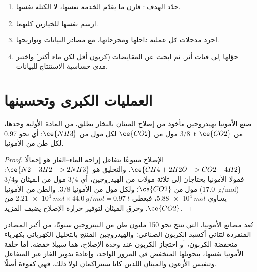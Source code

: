 \begin{method}\label{met:b3:green-industrial:lca}
\begin{enumerate}
  \item حدّد الهدف : قارن ما يقدّم الخدمة
        نفسها، لا الكتلة نفسها.
  \item ارسم  نفسها للخيارين كليهما.
  \item اجرد مدخلات كل عملية داخلها ومخرجاتها، مع مصادر
        البيانات وتواريخها.
  \item حوّلها إلى فئات أثر، ثم ابحث عن المقايضات (كربون أقل لكن
        ماء أكثر) واختبر مدى حساسية الاستنتاج للبيانات.
\end{enumerate}
\end{method}

\section{العمليات الكبرى وتحسينها}

\begin{proposition}\label{prop:b3:green-industrial:smr}
صنع الأمونيا بهيدروجين مأخوذ من إصلاح الميثان بالبخار يطلق، من
المادة الأولية وحدها، $3/8$ مول من $\ce{CO2}$ لكل مول من $\ce{NH3}$: أي نحو \qty{0.97}{t} من $\ce{CO2}$ لكل طن من الأمونيا.
\end{proposition}

\begin{proof}
الإصلاح متبوعًا بتفاعل إزاحة الماء--الغاز هو إجمالًا $\ce{CH4 + 2H2O -> CO2 + 4H2}$. والتخليق
هو $\ce{N2 + 3H2 -> 2NH3}$: فمولا الأمونيا يحتاجان إلى ثلاثة مولات من الهيدروجين، أي $3/4$ مول من
الميثان و$3/4$ مول من $\ce{CO2}$؛ ولكل مول من الأمونيا $3/8$. والطن من الأمونيا
(\qty{17.0}{g/mol}) يساوي $\qty{5.88e4}{mol}$، فيعطي $\qty{2.21e4}{mol} \times \qty{44.0}{g/mol} = \qty{0.97}{t}$ من $\ce{CO2}$. وحرق الميثان
لتوفير حرارة الإصلاح يضيف المزيد.
\end{proof}

تُعد مصانع الأمونيا، التي تنتج نحو 150 مليون طن من النيتروجين سنويًا، من
أكبر المصادر المنفردة لثنائي أكسيد الكربون الصناعي؛ والهيدروجين المنتَج
بالتحليل الكهربائي بكهرباء منخفضة الكربون، أو احتجاز الكربون عند وحدة الإصلاح،
هما سبيلا خفضه. أما حلقة الأمونيا نفسها، بتحويلها المنخفض في المرور
الواحد، وإعادة تدوير الغاز غير المتفاعل وتنفيس الأرغون والميثان اللذين
كانا سيتراكمان لولا ذلك، فهي كفوءة أصلًا.

